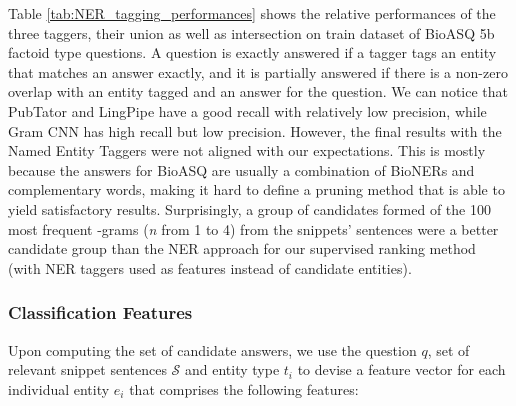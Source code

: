 \documentclass[11pt,a4paper]{article}
\begin{document}
Table \ref{tab:NER_tagging_performances} shows the relative performances of the three taggers, their union as well as intersection on train dataset of BioASQ 5b factoid type questions. A question is exactly answered if a tagger tags an entity that matches an answer exactly, and it is partially answered if there is a non-zero overlap with an entity tagged and an answer for the question. We can notice that PubTator and LingPipe have a good recall with relatively low precision, while Gram CNN has high recall but low precision. However, the final results with the Named Entity Taggers were not aligned with our expectations. This is mostly because the answers for BioASQ are usually a combination of BioNERs and complementary words, making it hard to define a pruning method that is able to yield satisfactory results. Surprisingly, a group of candidates formed of the 100 most frequent -grams (\textit{n} from 1 to 4) from the snippets' sentences were a better candidate group than the NER approach for our supervised ranking method (with NER taggers used as features instead of candidate entities).

\subsubsection{Classification Features}\label{sec:classification_features}

Upon computing the set of candidate answers, we use the question $q$, set of relevant snippet sentences $\mathcal{S}$ and entity type $t_i$ to devise a feature vector for each individual entity $e_i$ that comprises the following features:
\end{document}
